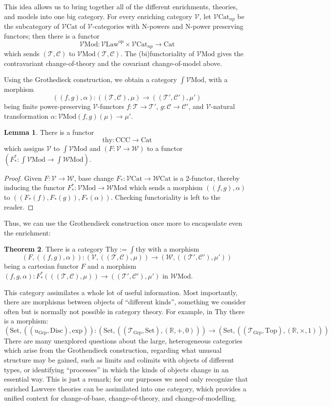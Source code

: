 \documentclass{amsart}
\theoremstyle{definition}
\newtheorem{theorem}{Theorem}
\newtheorem{lemma}[theorem]{Lemma}
\newcommand{\Set}{\mathrm{Set}}
\newcommand{\Grp}{\mathrm{Grp}}
\newcommand{\Cat}{\mathrm{Cat}}
\newcommand{\Law}{\mathrm{Law}}
\newcommand{\Top}{\mathrm{Top}}
\newcommand{\CCC}{\mathrm{CCC}}
\newcommand{\Mod}{\mathrm{Mod}}
\newcommand{\op}{\mathrm{op}}
\newcommand{\NN}{\mathrm{N}}
\newcommand{\V}{\mathscr{V}}
\newcommand{\W}{\mathscr{W}}
\newcommand{\C}{\mathscr{C}}
\newcommand{\T}{\mathscr{T}}
\newcommand{\maps}{\colon}
\begin{document}
This idea allows us to bring together all of the different enrichments, theories, and models into one big category. For every enriching category $\V$, let $\V\Cat_{np}$ be the subcategory of $\V\Cat$ of $\V$-categories with $\NN$-powers and $\NN$-power preserving functors; then there is a functor $$\V\Mod\maps \V\Law^\op \times \V\Cat_{np} \to \Cat$$ which sends $(\T,\C)$ to $\V\Mod(\T,\C)$. The (bi)functoriality of $\V\Mod$ gives the contravariant change-of-theory and the covariant change-of-model above.

Using the Grothedieck construction, we obtain a category \textbf{$\int \V\Mod$}, with a morphism $$((f,g),\alpha)\maps ((\T,\C),\mu) \to ((\T',\C'),\mu')$$ being finite power-preserving $\V$-functors $f\maps\T\to \T'$, $g\maps\C\to \C'$, and $\V$-natural transformation $\alpha\maps\V\Mod(f,g)(\mu)\to \mu'$.

\begin{lemma}
	There is a functor $$\mathrm{thy}\maps \CCC \to \Cat$$ which assigns $\V$ to $\int \V\Mod$ and $(F\maps \V \to \W)$ to a functor $(F_*^*\maps \int \V\Mod \to \int \W\Mod)$.
\end{lemma}
\begin{proof}
	Given $F\maps\V\to \W$, base change $F_*\maps \V\Cat \to \W\Cat$ is a 2-functor, thereby inducing the functor $F_*^*\maps\V\Mod\to \W\Mod$ which sends a morphism $((f,g),\alpha)$ to $((F_*(f),F_*(g)),F_*(\alpha))$. Checking functoriality is left to the reader.
\end{proof}

Thus, we can use the Grothendieck construction once more to encapsulate even the enrichment:
\begin{theorem}
	There is a category $\mathrm{Thy} := \int \mathrm{thy}$ with a morphism $$(F,((f,g),\alpha))\maps (\V,((\T,\C),\mu)) \to (\W,((\T',\C'),\mu'))$$ being a cartesian functor $F$ and a morphism $(f,g,\alpha)\maps F_*^*(((\T,\C),\mu)) \to ((\T',\C'),\mu')$ in $\W\Mod$.
\end{theorem}

This category assimilates a whole lot of useful information. Most importantly, there are morphisms between objects of ``different kinds'', something we consider often but is normally not possible in category theory. For example, in $\mathrm{Thy}$ there is a morphism: $$(\Set, ((u_{\Grp}, \mathrm{Disc}), \mathrm{exp}))\maps (\Set,((\T_{\mathrm{Grp}},\Set),(\mathbb{R},+,0))) \to (\Set,((\T_\Grp,\Top),(\mathbb{R},\times,1)))$$
There are many unexplored questions about the large, heterogeneous categories which arise from the Grothendieck construction, regarding what unusual structure may be gained, such as limits and colimits with objects of different types, or identifying ``processes'' in which the kinds of objects change in an essential way. This is just a remark; for our purposes we need only recognize that enriched Lawvere theories can be assimilated into one category, which provides a unified context for change-of-base, change-of-theory, and change-of-modelling.
\end{document}
